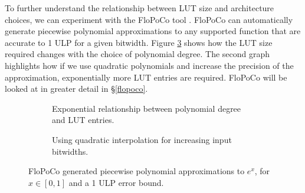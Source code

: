 \documentclass{fac}
\begin{document}
To further understand the relationship between LUT size and architecture choices, we can experiment with the FloPoCo tool \cite{DinechinPasca2011-DaT}. FloPoCo can automatically generate piecewise polynomial approximations to any supported function that are accurate to 1 ULP for a given bitwidth. Figure \ref{fig:flopo_graph} shows how the LUT size required changes with the choice of polynomial degree. The second graph highlights how if we use quadratic polynomials and increase the precision of the approximation, exponentially more LUT entries are required. FloPoCo will be looked at in greater detail in \S \ref{flopoco}.

\begin{figure}
\centering
\begin{subfigure}{.45\textwidth}
  \centering
  \caption{Exponential relationship between polynomial degree and LUT entries.}
  \label{poly_deg_vs_lut}
\end{subfigure}\hspace{1em}%
\begin{subfigure}{.45\textwidth}
  \centering
  
  \caption{Using quadratic interpolation for increasing input bitwidths.}
  \label{input_width_vs_lut}
\end{subfigure}
\caption{FloPoCo \cite{DinechinPasca2011-DaT} generated piecewise polynomial approximations to $e^{x}$, for $x \in [0,1]$ and a 1 ULP error bound.}
\label{fig:flopo_graph}
\end{figure}
\end{document}
